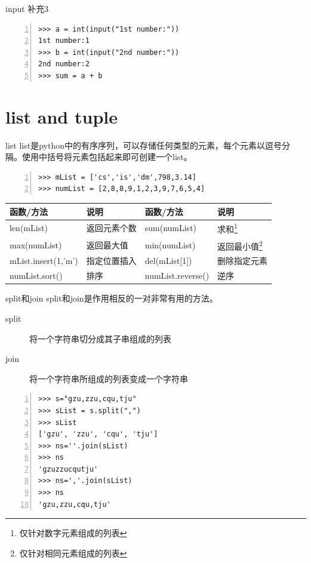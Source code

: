 \documentclass{beamer}
\begin{document}
\begin{frame}[fragile]{input 补充3}
\begin{block}{}
\begin{Verbatim}[numbers=left,frame=single,rulecolor=\color{red}]
>>> a = int(input("1st number:"))
1st number:1
>>> b = int(input("2nd number:"))
2nd number:2
>>> sum = a + b
\end{Verbatim}
\end{block}
\end{frame}
\section{list and tuple}
\begin{frame}
\end{frame}
\begin{frame}[fragile]{list}
list是python中的有序序列，可以存储任何类型的元素，每个元素以逗号分隔。使用中括号将元素包括起来即可创建一个list。
\begin{block}{}
\begin{Verbatim}[numbers=left,frame=single,rulecolor=\color{red}]
>>> mList = ['cs','is','dm',798,3.14]
>>> numList = [2,8,8,9,1,2,3,9,7,6,5,4]
\end{Verbatim}
\end{block}
\begin{table}
\begin{tabular}{llll}
\toprule
\textbf{函数/方法}&\textbf{说明}&\textbf{函数/方法}&\textbf{说明}\\
\midrule
len(mList)&返回元素个数&sum(numList)&求和\footnote{仅针对数字元素组成的列表}\\
max(numList)&返回最大值&min(numList)&返回最小值\footnote{仅针对相同元素组成的列表}\\
mList.insert(1,'m')&指定位置插入&del(mList[1])&删除指定元素\\
numList.sort()&排序&numList.reverse()&逆序\\
\bottomrule
\end{tabular}
\end{table}

\end{frame}
\begin{frame}[fragile]{split和join}
split和join是作用相反的一对非常有用的方法。
\begin{description}
\item[split]
将一个字符串切分成其子串组成的列表
\item[join] 
将一个字符串所组成的列表变成一个字符串
\end{description}

\begin{block}{}
\begin{Verbatim}[numbers=left,frame=single,rulecolor=\color{red}]
>>> s="gzu,zzu,cqu,tju"
>>> sList = s.split(",")
>>> sList
['gzu', 'zzu', 'cqu', 'tju']
>>> ns=''.join(sList)
>>> ns
'gzuzzucqutju'
>>> ns=','.join(sList)
>>> ns
'gzu,zzu,cqu,tju'
\end{Verbatim}
\end{block}
\end{frame}
\end{document}
